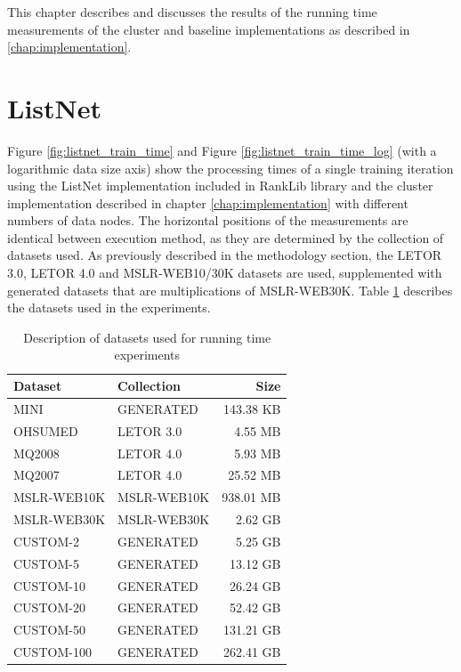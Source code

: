 This chapter describes and discusses the results of the running time measurements of the cluster and baseline implementations as described in \ref{chap:implementation}.
\section{ListNet}
Figure \ref{fig:listnet_train_time} and Figure \ref{fig:listnet_train_time_log} (with a logarithmic data size axis) show the processing times of a single training iteration using the ListNet implementation included in RankLib library and the cluster implementation described in chapter \ref{chap:implementation} with different numbers of data nodes. The horizontal positions of the measurements are identical between execution method, as they are determined by the collection of datasets used. As previously described in the methodology section, the LETOR 3.0, LETOR 4.0 and MSLR-WEB10/30K datasets are used, supplemented with generated datasets that are multiplications of MSLR-WEB30K. Table \ref{tbl:recap_datasets} describes the datasets used in the experiments.

\begin{table}[!h]
\centering
\begin{tabular}{p{3.4cm}p{3.4cm}r}\toprule
Dataset & Collection & Size \\
\midrule
MINI		& GENERATED		  & 143.38 KB\\
OHSUMED     & LETOR 3.0       &   4.55 MB\\
MQ2008      & LETOR 4.0       &   5.93 MB\\
MQ2007      & LETOR 4.0       &  25.52 MB\\
MSLR-WEB10K & MSLR-WEB10K     & 938.01 MB\\
MSLR-WEB30K & MSLR-WEB30K     &   2.62 GB\\
CUSTOM-2	& GENERATED		  &   5.25 GB\\
CUSTOM-5	& GENERATED		  &  13.12 GB\\
CUSTOM-10	& GENERATED		  &  26.24 GB\\
CUSTOM-20   & GENERATED       &  52.42 GB\\
CUSTOM-50	& GENERATED		  & 131.21 GB\\
CUSTOM-100	& GENERATED		  & 262.41 GB\\
\bottomrule
\end{tabular}
\caption{Description of datasets used for running time experiments}
\label{tbl:recap_datasets}
\end{table}

